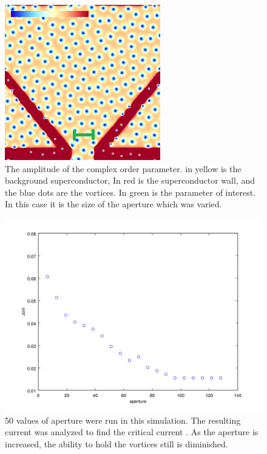 \begin{figure}[htbp]
\begin{center}
\includegraphics[scale=.50]{normalX.png}
\caption{ The amplitude of the complex order parameter. in yellow is the background superconductor, In red is the superconductor wall, and the blue dots are the vortices. In green is the parameter of interest. In this case it is the size of the aperture which was varied. }
\label{normalX}
\end{center}
\end{figure}

\begin{figure}[htbp]
\begin{center}
\includegraphics[scale=.50]{normalXscan.png}
\caption{ 50 values of aperture were run in this simulation. The resulting current was analyzed to find the critical current . As the aperture is increased, the ability to hold the vortices still is diminished. }
\label{normalXscan}
\end{center}
\end{figure}

